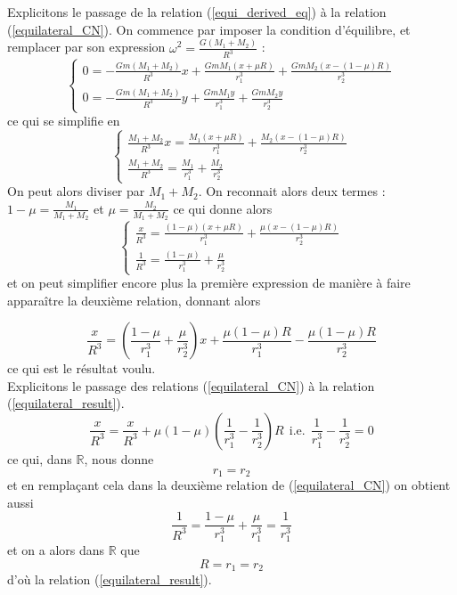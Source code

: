\documentclass[12pt]{article}
\begin{document}
	Explicitons le passage de la relation (\ref{equi_derived_eq}) à la relation (\ref{equilateral_CN}). On commence par imposer la condition d'équilibre, et remplacer par son expression $\omega^2 = \frac{G(M_1+M_2)}{R^3}$ :
	\begin{equation*}
		\begin{cases}
			0 = -\frac{Gm(M_1+M_2)}{R^3}x+\frac{GmM_1(x+\mu R)}{r_1^3}+\frac{GmM_2(x-(1-\mu)R)}{r_2^3}
			\\
			0 = -\frac{Gm(M_1+M_2)}{R^3}y+\frac{GmM_1y}{r_1^3}+\frac{GmM_2y}{r_2^3}
		\end{cases}
	\end{equation*}
	ce qui se simplifie en
	\begin{equation*}
		\begin{cases}
			\frac{M_1+M_2}{R^3}x = \frac{M_1(x+\mu R)}{r_1^3}+\frac{M_2(x-(1-\mu)R)}{r_2^3}
			\\
			\frac{M_1+M_2}{R^3} = \frac{M_1}{r_1^3}+\frac{M_2}{r_2^3}
		\end{cases}
	\end{equation*}
	On peut alors diviser par $M_1+M_2$. On reconnait alors deux termes : $1-\mu = \frac{M_1}{M_1+M_2}$ et $\mu = \frac{M_2}{M_1+M_2}$ ce qui donne alors
	\begin{equation*}
		\begin{cases}
			\frac{x}{R^3} = \frac{(1-\mu)(x+\mu R)}{r_1^3}+\frac{\mu(x-(1-\mu)R)}{r_2^3}
			\\
			\frac{1}{R^3} = \frac{(1-\mu)}{r_1^3}+\frac{\mu}{r_2^3}
		\end{cases}
	\end{equation*}
	et on peut simplifier encore plus la première expression de manière à faire apparaître la deuxième relation, donnant alors
	
	\begin{equation*}
		\frac{x}{R^3} = (\frac{1-\mu}{r_1^3} + \frac{\mu}{r_2^3})x + \frac{\mu(1-\mu)R}{r_1^3} - \frac{\mu(1-\mu)R}{r_2^3}
	\end{equation*}
	ce qui est le résultat voulu.
	\\
	
	Explicitons le passage des relations (\ref{equilateral_CN}) à la relation (\ref{equilateral_result}).
	\begin{equation*}
		\frac{x}{R^3} = \frac{x}{R^3} + \mu(1-\mu)(\frac{1}{r_1^3}-\frac{1}{r_2^3})R \ \ \text{i.e.} \ \ \frac{1}{r_1^3}-\frac{1}{r_2^3} = 0
	\end{equation*}
	ce qui, dans $\mathbb{R}$, nous donne
	\begin{equation*}
		r_1=r_2
	\end{equation*}
	et en remplaçant cela dans la deuxième relation de (\ref{equilateral_CN}) on obtient aussi
	\begin{equation*}
		\frac{1}{R^3} = \frac{1-\mu}{r_1^3} + \frac{\mu}{r_1^3} = \frac{1}{r_1^3}
	\end{equation*}
	et on a alors dans $\mathbb{R}$ que
	\begin{equation*}
		R=r_1=r_2
	\end{equation*}
	d'où la relation (\ref{equilateral_result}).
	
	
\end{document}
